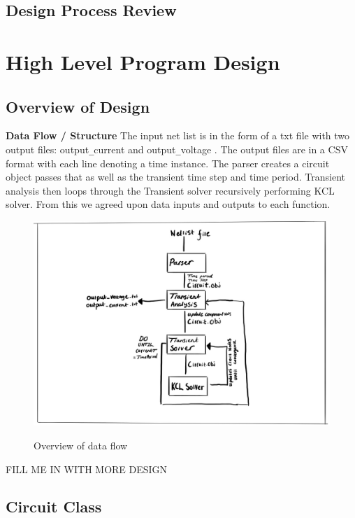 \documentclass{article}
\begin{document}
\newpage
\subsection{Design Process Review}

\newpage

\section{High Level Program Design }
\subsection{Overview of Design}
\textbf{Data Flow / Structure}
\newline
The input net list is in the form of a txt file with two output files: output\verb|_|current and output\verb|_|voltage . The output files are in a CSV format with each line denoting a time instance. The parser creates a circuit object passes that as well as the transient time step and time period. Transient analysis then loops through the Transient solver recursively performing KCL solver. From this we agreed upon data inputs and outputs to each function.

\begin{figure}[h]
    \caption{Overview of data flow}
    \centering
    \includegraphics[width=\textwidth]{images/Comphpp.jpg}
    \label{fig:AlgoOverview}
\end{figure}

FILL ME IN WITH MORE DESIGN

\newpage
\subsection{Circuit Class}
\end{document}
